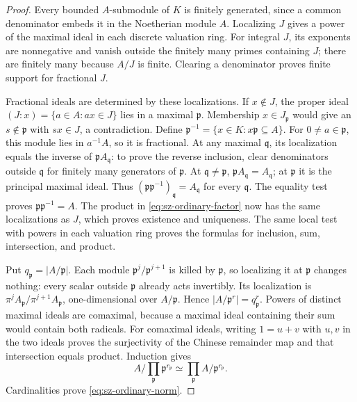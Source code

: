 \begin{proof}
Every bounded \(A\)-submodule of \(K\) is finitely generated, since
a common denominator embeds it in the Noetherian module \(A\).
Localizing \(J\) gives a power of the maximal ideal in each discrete
valuation ring. For integral \(J\), its exponents are nonnegative
and vanish outside the finitely many primes containing \(J\);
there are finitely many because \(A/J\) is finite. Clearing a
denominator proves finite support for fractional \(J\).

Fractional ideals are determined by these localizations. If \(x\notin J\),
the proper ideal \((J:x)=\{a\in A:ax\in J\}\) lies in a maximal
\(\mathfrak p\). Membership \(x\in J_{\mathfrak p}\) would give an
\(s\notin\mathfrak p\) with \(sx\in J\), a contradiction.
Define \(\mathfrak p^{-1}=\{x\in K:x\mathfrak p\subseteq A\}\).
For \(0\ne a\in\mathfrak p\), this module lies in \(a^{-1}A\), so it
is fractional. At any maximal \(\mathfrak q\), its localization equals
the inverse of \(\mathfrak p A_{\mathfrak q}\): to prove the reverse
inclusion, clear denominators outside \(\mathfrak q\) for finitely
many generators of \(\mathfrak p\).
At \(\mathfrak q\ne\mathfrak p\), \(\mathfrak p A_{\mathfrak q}=A_{\mathfrak q}\);
at \(\mathfrak p\) it is the principal maximal ideal. Thus
\((\mathfrak p\mathfrak p^{-1})_{\mathfrak q}=A_{\mathfrak q}\)
for every \(\mathfrak q\). The equality test proves
\(\mathfrak p\mathfrak p^{-1}=A\).
The product in \eqref{eq:sz-ordinary-factor} now has the same
localizations as \(J\), which proves existence and uniqueness.
The same local test with powers in each valuation ring proves the
formulas for inclusion, sum, intersection, and product.

Put \(q_{\mathfrak p}=|A/\mathfrak p|\). Each module
\(\mathfrak p^j/\mathfrak p^{j+1}\) is killed by \(\mathfrak p\), so
localizing it at \(\mathfrak p\) changes nothing: every scalar
outside \(\mathfrak p\) already acts invertibly. Its localization
is \(\pi^j A_{\mathfrak p}/\pi^{j+1}A_{\mathfrak p}\), one-dimensional
over \(A/\mathfrak p\). Hence \(|A/\mathfrak p^r|=q_{\mathfrak p}^r\).
Powers of distinct maximal ideals are comaximal, because a maximal
ideal containing their sum would contain both radicals. For comaximal
ideals, writing \(1=u+v\) with \(u,v\) in the two ideals proves the
surjectivity of the Chinese remainder map and that intersection
equals product. Induction gives
\[
 A/\prod_{\mathfrak p}\mathfrak p^{r_{\mathfrak p}}
 \simeq\prod_{\mathfrak p}A/\mathfrak p^{r_{\mathfrak p}}.
\]
Cardinalities prove \eqref{eq:sz-ordinary-norm}.
\end{proof}


